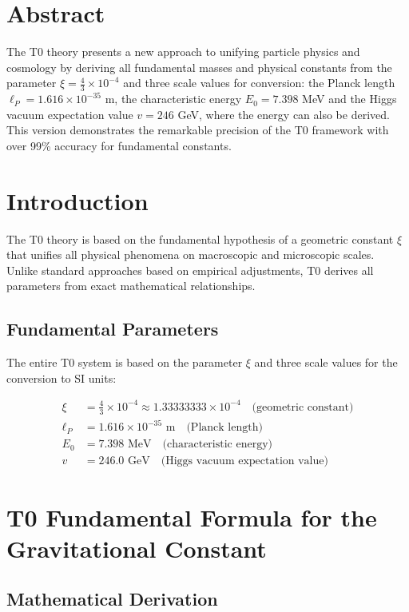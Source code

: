 \section*{Abstract}
		The T0 theory presents a new approach to unifying particle physics and cosmology by deriving all fundamental masses and physical constants from the parameter $\xi = \frac{4}{3} \times 10^{-4}$ and three scale values for conversion: the Planck length $\ell_P = 1.616 \times 10^{-35}$ m, the characteristic energy $E_0 = 7.398$ MeV and the Higgs vacuum expectation value $v = 246$ GeV, where the energy can also be derived. This version demonstrates the remarkable precision of the T0 framework with over 99\% accuracy for fundamental constants.

	
	\section{Introduction}
	
	The T0 theory is based on the fundamental hypothesis of a geometric constant $\xi$ that unifies all physical phenomena on macroscopic and microscopic scales. Unlike standard approaches based on empirical adjustments, T0 derives all parameters from exact mathematical relationships.
	
	\subsection{Fundamental Parameters}
	
	The entire T0 system is based on the parameter $\xi$ and three scale values for the conversion to SI units:
	
	\begin{align}
		\xi &= \frac{4}{3} \times 10^{-4} \approx 1.33333333 \times 10^{-4} \quad \text{(geometric constant)} \\
		\ell_P &= 1.616 \times 10^{-35} \text{ m} \quad \text{(Planck length)} \\
		E_0 &= 7.398 \text{ MeV} \quad \text{(characteristic energy)} \\
		v &= 246.0 \text{ GeV} \quad \text{(Higgs vacuum expectation value)}
	\end{align}
	
	\section{T0 Fundamental Formula for the Gravitational Constant}
	
	\subsection{Mathematical Derivation}
	
